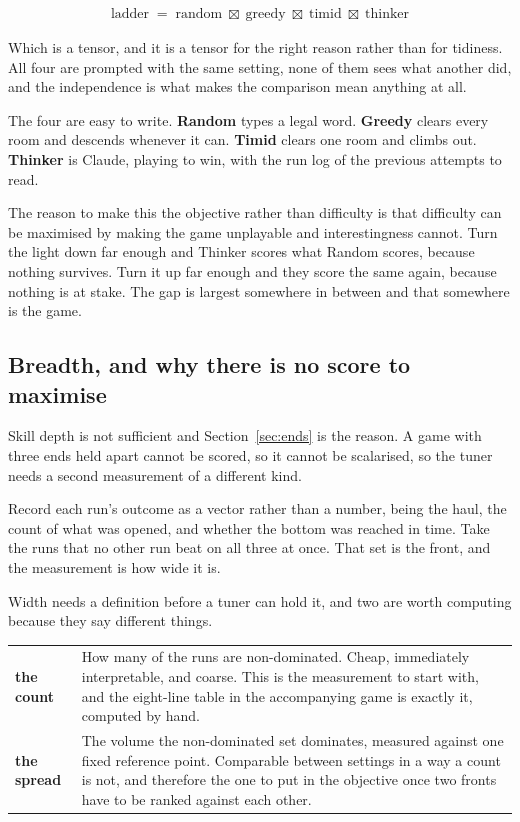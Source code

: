 \documentclass[11pt,a4paper]{article}
\begin{document}
\begin{align*}
\text{ladder} \;=\; \text{random} \;\boxtimes\; \text{greedy} \;\boxtimes\; \text{timid} \;\boxtimes\; \text{thinker}
\end{align*}

Which is a tensor, and it is a tensor for the right reason rather than for tidiness. All four are
prompted with the same setting, none of them sees what another did, and the independence is what
makes the comparison mean anything at all.

The four are easy to write. \textbf{Random} types a legal word. \textbf{Greedy} clears every room
and descends whenever it can. \textbf{Timid} clears one room and climbs out. \textbf{Thinker} is
Claude, playing to win, with the run log of the previous attempts to read.

\begin{sectionbox}
The reason to make this the objective rather than difficulty is that difficulty can be maximised
by making the game unplayable and interestingness cannot. Turn the light down far enough and
Thinker scores what Random scores, because nothing survives. Turn it up far enough and they
score the same again, because nothing is at stake. The gap is largest somewhere in between and
that somewhere is the game.
\end{sectionbox}

\subsection{Breadth, and why there is no score to maximise}
\label{sec:breadth}

Skill depth is not sufficient and Section~\ref{sec:ends} is the reason. A game with three ends
held apart cannot be scored, so it cannot be scalarised, so the tuner needs a second measurement
of a different kind.

Record each run's outcome as a vector rather than a number, being the haul, the count of what was
opened, and whether the bottom was reached in time. Take the runs that no other run beat on all
three at once. That set is the front, and the measurement is how wide it is.

Width needs a definition before a tuner can hold it, and two are worth computing because they say
different things.

\begin{center}
\begin{tabular}{@{}l@{\hspace{5mm}}>{\raggedright\arraybackslash}p{}@{}}
\toprule
\textbf{the count} & How many of the runs are non-dominated. Cheap, immediately interpretable,
and coarse. This is the measurement to start with, and the eight-line table in the accompanying
game is exactly it, computed by hand. \\[1mm]
\textbf{the spread} & The volume the non-dominated set dominates, measured against one fixed
reference point. Comparable between settings in a way a count is not, and therefore the one to put
in the objective once two fronts have to be ranked against each other. \\
\bottomrule
\end{tabular}
\end{center}
\end{document}
